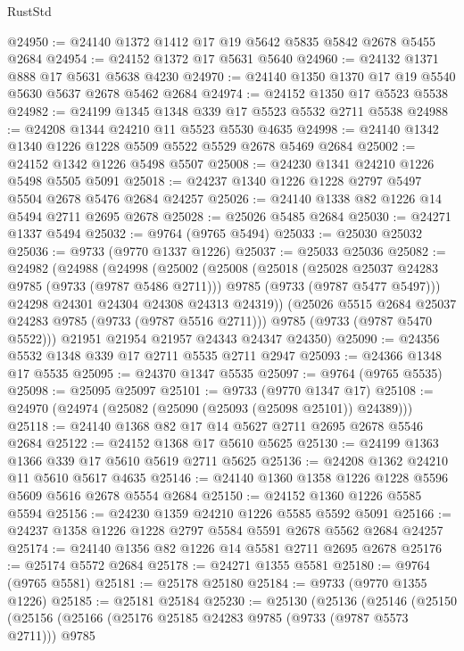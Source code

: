 \begin{lexlean}{RustStd}
\begin{coremodule}
@24950 := @24140 @1372 @1412 @17 @19 @5642 @5835 @5842 @2678 @5455 @2684
@24954 := @24152 @1372 @17 @5631 @5640
@24960 := @24132 @1371 @888 @17 @5631 @5638 @4230
@24970 := @24140 @1350 @1370 @17 @19 @5540 @5630 @5637 @2678 @5462 @2684
@24974 := @24152 @1350 @17 @5523 @5538
@24982 := @24199 @1345 @1348 @339 @17 @5523 @5532 @2711 @5538
@24988 := @24208 @1344 @24210 @11 @5523 @5530 @4635
@24998 := @24140 @1342 @1340 @1226 @1228 @5509 @5522 @5529 @2678 @5469 @2684
@25002 := @24152 @1342 @1226 @5498 @5507
@25008 := @24230 @1341 @24210 @1226 @5498 @5505 @5091
@25018 := @24237 @1340 @1226 @1228 @2797 @5497 @5504 @2678 @5476 @2684 @24257
@25026 := @24140 @1338 @82 @1226 @14 @5494 @2711 @2695 @2678
@25028 := @25026 @5485 @2684
@25030 := @24271 @1337 @5494
@25032 := @9764 (@9765 @5494)
@25033 := @25030 @25032
@25036 := @9733 (@9770 @1337 @1226)
@25037 := @25033 @25036
@25082 := @24982
    (@24988
      (@24998
        (@25002
          (@25008
            (@25018
              (@25028 @25037 @24283 @9785 (@9733 (@9787 @5486 @2711)))
              @9785
              (@9733 (@9787 @5477 @5497)))
            @24298
            @24301
            @24304
            @24308
            @24313
            @24319))
        (@25026 @5515 @2684 @25037 @24283 @9785 (@9733 (@9787 @5516 @2711)))
        @9785
        (@9733 (@9787 @5470 @5522)))
      @21951
      @21954
      @21957
      @24343
      @24347
      @24350)
@25090 := @24356 @5532 @1348 @339 @17 @2711 @5535 @2711 @2947
@25093 := @24366 @1348 @17 @5535
@25095 := @24370 @1347 @5535
@25097 := @9764 (@9765 @5535)
@25098 := @25095 @25097
@25101 := @9733 (@9770 @1347 @17)
@25108 := @24970 (@24974 (@25082 (@25090 (@25093 (@25098 @25101)) @24389)))
@25118 := @24140 @1368 @82 @17 @14 @5627 @2711 @2695 @2678 @5546 @2684
@25122 := @24152 @1368 @17 @5610 @5625
@25130 := @24199 @1363 @1366 @339 @17 @5610 @5619 @2711 @5625
@25136 := @24208 @1362 @24210 @11 @5610 @5617 @4635
@25146 := @24140 @1360 @1358 @1226 @1228 @5596 @5609 @5616 @2678 @5554 @2684
@25150 := @24152 @1360 @1226 @5585 @5594
@25156 := @24230 @1359 @24210 @1226 @5585 @5592 @5091
@25166 := @24237 @1358 @1226 @1228 @2797 @5584 @5591 @2678 @5562 @2684 @24257
@25174 := @24140 @1356 @82 @1226 @14 @5581 @2711 @2695 @2678
@25176 := @25174 @5572 @2684
@25178 := @24271 @1355 @5581
@25180 := @9764 (@9765 @5581)
@25181 := @25178 @25180
@25184 := @9733 (@9770 @1355 @1226)
@25185 := @25181 @25184
@25230 := @25130
    (@25136
      (@25146
        (@25150
          (@25156
            (@25166
              (@25176 @25185 @24283 @9785 (@9733 (@9787 @5573 @2711)))
              @9785

\end{coremodule}
\end{lexlean}
